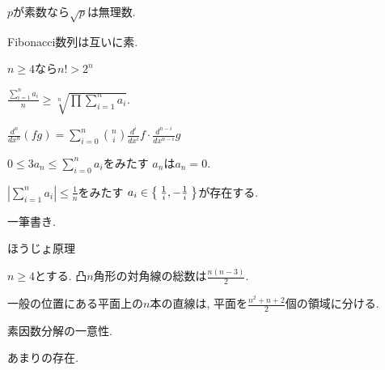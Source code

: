 \begin{prop}
  $p$が素数なら$\sqrt{p}$は無理数.
\end{prop}

\begin{prop}
  Fibonacci数列は互いに素.
\end{prop}



\begin{prop}
  $n\geq 4$なら$n!>2^n$
\end{prop}



\begin{prop}
  $\frac{\sum_{i=1}^n a_i}{n} \geq \sqrt[n]{\prod\sum_{i=1}^n a_i}$.
\end{prop}


\begin{prop}
$\frac{d^n}{dx^n}(fg)=\sum_{i=0}^n\binom{n}{i}\frac{d^i}{dx^i}f \cdot \frac{d^{n-i}}{dx^{n-i}}g$
\end{prop}




\begin{prop}
  $0\leq 3a_n\leq\sum_{i=0}^n a_i$をみたす
  $a_n$は$a_n=0$.
\end{prop}

\begin{prop}
  $|\sum_{i=1}^{n}a_i|\leq \frac{1}{n}$をみたす
  $a_i\in\Set{\frac{1}{i},-\frac{1}{i}}$が存在する.
\end{prop}

\begin{prop}
一筆書き.
\end{prop}

\begin{prop}
ほうじょ原理
\end{prop}

\begin{prop}
  $n\geq 4$とする.
  凸$n$角形の対角線の総数は$\frac{n(n-3)}{2}$.
\end{prop}

\begin{prop}
  一般の位置にある平面上の$n$本の直線は,
  平面を$\frac{n^2+n+2}{2}$個の領域に分ける.
\end{prop}

\begin{prop}
  素因数分解の一意性.
\end{prop}

\begin{prop}
  あまりの存在.
\end{prop}

